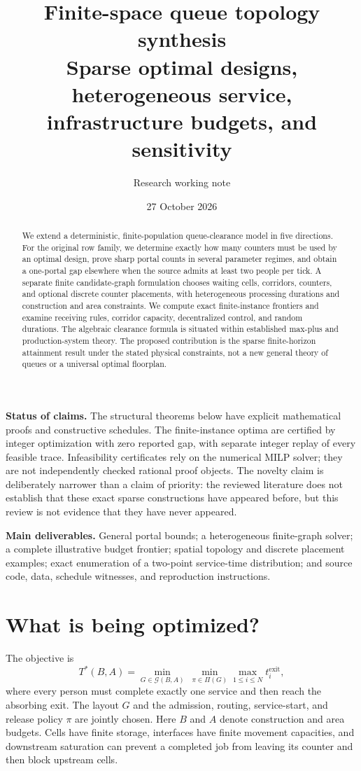 \documentclass[11pt]{article}
\title{Finite-space queue topology synthesis\\\large Sparse optimal designs, heterogeneous service, infrastructure budgets, and sensitivity}
\author{Research working note}
\date{27 October 2026}
\begin{document}
\maketitle
\begin{abstract}
We extend a deterministic, finite-population queue-clearance model in five directions. For the original row family, we determine exactly how many counters must be used by an optimal design, prove sharp portal counts in several parameter regimes, and obtain a one-portal gap elsewhere when the source admits at least two people per tick. A separate finite candidate-graph formulation chooses waiting cells, corridors, counters, and optional discrete counter placements, with heterogeneous processing durations and construction and area constraints. We compute exact finite-instance frontiers and examine receiving rules, corridor capacity, decentralized control, and random durations. The algebraic clearance formula is situated within established max-plus and production-system theory. The proposed contribution is the sparse finite-horizon attainment result under the stated physical constraints, not a new general theory of queues or a universal optimal floorplan.
\end{abstract}

\textbf{Status of claims.} The structural theorems below have explicit mathematical proofs and constructive schedules. The finite-instance optima are certified by integer optimization with zero reported gap, with separate integer replay of every feasible trace. Infeasibility certificates rely on the numerical MILP solver; they are not independently checked rational proof objects. The novelty claim is deliberately narrower than a claim of priority: the reviewed literature does not establish that these exact sparse constructions have appeared before, but this review is not evidence that they have never appeared.

\textbf{Main deliverables.} General portal bounds; a heterogeneous finite-graph solver; a complete illustrative budget frontier; spatial topology and discrete placement examples; exact enumeration of a two-point service-time distribution; and source code, data, schedule witnesses, and reproduction instructions.

\newpage
\tableofcontents
\newpage

\section{What is being optimized?}
The objective is
\[
  T^*(B,A)=\min_{G\in\mathcal G(B,A)}\ \min_{\pi\in\Pi(G)}
  \max_{1\le i\le N} t_i^{\mathrm{exit}},
\]
where every person must complete exactly one service and then reach the absorbing exit. The layout $G$ and the admission, routing, service-start, and release policy $\pi$ are jointly chosen. Here $B$ and $A$ denote construction and area budgets. Cells have finite storage, interfaces have finite movement capacities, and downstream saturation can prevent a completed job from leaving its counter and then block upstream cells.
\end{document}
